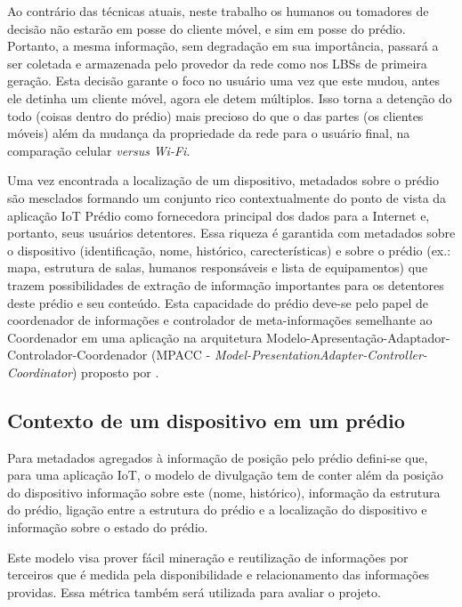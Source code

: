Ao contrário das técnicas atuais, neste trabalho os humanos ou tomadores de
decisão não estarão em posse do cliente móvel, e sim em posse do prédio.
Portanto, a mesma informação, sem degradação em sua importância, passará a ser
coletada e armazenada pelo provedor da rede como nos LBSs de primeira geração.
Esta decisão garante o foco no usuário uma vez que este mudou, antes ele detinha
um cliente móvel, agora ele detem múltiplos. Isso torna a detenção do todo
(coisas dentro do prédio) mais precioso do que o das partes (os clientes móveis)
além da mudança da propriedade da rede para o usuário final, na comparação
celular \emph{versus} \emph{Wi-Fi}.

Uma vez encontrada a localização de um dispositivo, metadados sobre o prédio são
mesclados formando um conjunto rico contextualmente do ponto de vista da
aplicação IoT Prédio como fornecedora principal dos dados para a Internet e,
portanto, seus usuários detentores. Essa riqueza é garantida com metadados sobre
o dispositivo (identificação, nome, histórico, carecterísticas) e sobre o prédio
(ex.: mapa, estrutura de salas, humanos responsáveis e lista de equipamentos) que trazem possibilidades de
extração de informação importantes para os detentores deste prédio e seu
conteúdo. Esta capacidade do prédio deve-se pelo papel de coordenador de
informações e controlador de meta-informações semelhante ao Coordenador em uma
aplicação na arquitetura Modelo-Apresentação-Adaptador-Controlador-Coordenador
(MPACC - \emph{Model-PresentationAdapter-Controller-Coordinator}) proposto por
.


\subsection{Contexto de um dispositivo em um prédio}
\label{subsec:Contexto de um dispositivo em um prédio}

Para metadados agregados à informação de posição pelo prédio defini-se que, para uma aplicação IoT, o
modelo de divulgação tem de conter além da posição do dispositivo informação
sobre este (nome, histórico), informação da estrutura do prédio, ligação entre a estrutura
do prédio e a localização do dispositivo e informação
sobre o estado do prédio.


Este modelo visa prover fácil mineração e reutilização de informações por
terceiros que é medida pela disponibilidade e
relacionamento das informações providas. Essa métrica também será utilizada para
avaliar o projeto.


